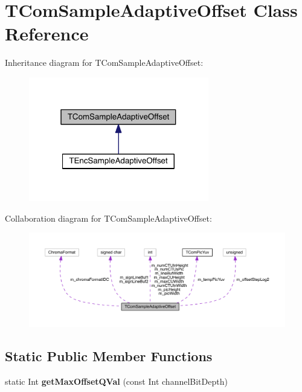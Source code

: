\hypertarget{class_t_com_sample_adaptive_offset}{}\section{T\+Com\+Sample\+Adaptive\+Offset Class Reference}
\label{class_t_com_sample_adaptive_offset}


Inheritance diagram for T\+Com\+Sample\+Adaptive\+Offset\+:
\nopagebreak
\begin{figure}[H]
\begin{center}
\leavevmode
\includegraphics[width=223pt]{dd/de6/class_t_com_sample_adaptive_offset__inherit__graph}
\end{center}
\end{figure}


Collaboration diagram for T\+Com\+Sample\+Adaptive\+Offset\+:
\nopagebreak
\begin{figure}[H]
\begin{center}
\leavevmode
\includegraphics[width=350pt]{dc/dc6/class_t_com_sample_adaptive_offset__coll__graph}
\end{center}
\end{figure}
\subsection*{Static Public Member Functions}
\begin{DoxyCompactItemize}
\item 
\mbox{\label{class_t_com_sample_adaptive_offset_afc7f20c9753d079edd56dabbdd7862a9}} 
static Int {\bfseries get\+Max\+Offset\+Q\+Val} (const Int channel\+Bit\+Depth)
\end{DoxyCompactItemize}
